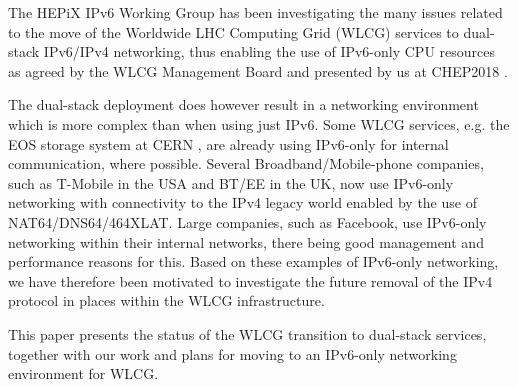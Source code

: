 

 


The HEPiX IPv6 Working Group \cite{ipv6wg} has been investigating the many issues related to the 
move of the Worldwide LHC Computing Grid (WLCG) services to dual-stack IPv6/IPv4 networking, thus enabling the use of
IPv6-only CPU resources as agreed by the WLCG Management Board and presented by us at 
CHEP2018 \cite{ipv6chep2018}. 

The dual-stack deployment does however result in a networking environment
which is more complex than when using just IPv6. Some WLCG services, e.g.
the EOS storage system at CERN \cite{eos}, are already using IPv6-only for internal communication,
where possible. Several Broadband/Mobile-phone companies, such as T-Mobile in the USA and
BT/EE in the UK, now use IPv6-only networking with connectivity to the IPv4
legacy world enabled by the use of NAT64/DNS64/464XLAT. Large companies, such
as Facebook, use IPv6-only networking within their internal networks, there
being good management and performance reasons for this. Based on these examples
of IPv6-only networking, we have therefore been motivated to investigate the future removal of the IPv4 protocol in
places within the WLCG infrastructure.

This paper presents the status of the WLCG transition to dual-stack services, together with 
our work and plans for moving to an IPv6-only networking environment for WLCG.

